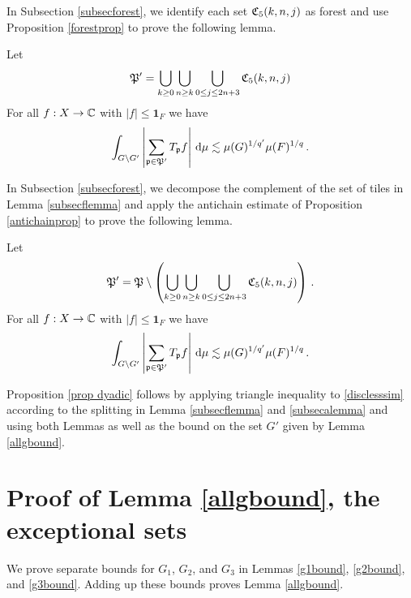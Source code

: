 In Subsection \ref{subsecforest}, we identify each set $\mathfrak C_5(k,n,j)$ as forest and use Proposition
\ref{forestprop} to prove the following lemma.


\begin{lemma}\label{subsecflemma}
  Let
  \begin{equation}
      \mathfrak P'=\bigcup_{k\ge 0}\bigcup_{n\ge k}
      \bigcup_{0\le j\le 2n+3}\mathfrak C_5(k,n,j)
  \end{equation}
  For all $f:X\to \mathbb{C}$ with $|f|\le \mathbf{1}_F$ we have
\begin{equation}
    \label{disclesssim1}
    \int_{G \setminus  G'} \left|\sum_{\mathfrak p \in \mathfrak P'} T_{\mathfrak p} f \right|\, \mathrm{d}\mu  \lesssim \mu(G)^{1/q'} \mu(F)^{1/q}\,.
\end{equation}
\end{lemma}

In Subsection \ref{subsecforest}, we decompose
the complement of the set of tiles in Lemma
\ref{subsecflemma} and apply the antichain estimate of
Proposition \ref{antichainprop} to prove the following lemma.

\begin{lemma}\label{subsecalemma}
  Let
  \begin{equation}
      \mathfrak P'=\mathfrak P\setminus \left(\bigcup_{k\ge 0}\bigcup_{n\ge k}
      \bigcup_{0\le j\le 2n+3}\mathfrak C_5(k,n,j)\right)\,.
  \end{equation}
 For all $f:X\to \mathbb{C}$ with $|f|\le \mathbf{1}_F$ we have
\begin{equation}
    \label{disclesssim2}
    \int_{G \setminus  G'} \left|\sum_{\mathfrak p \in \mathfrak P'} T_{\mathfrak p} f\right| \, \mathrm{d}\mu  \lesssim \mu(G)^{1/q'} \mu(F)^{1/q}\,.
\end{equation}
\end{lemma}
Proposition \ref{prop dyadic} follows by applying
triangle inequality to \eqref{disclesssim}
according to the splitting in Lemma \ref{subsecflemma}
and \ref{subsecalemma} and using both Lemmas as well
as the bound on the set $G'$ given by Lemma \ref{allgbound}.



\section{Proof of Lemma \ref{allgbound}, the exceptional sets}
\label{subsetexcset}


We prove separate bounds for $G_1$, $G_2$, and $G_3$
in Lemmas  \ref{g1bound},
\ref{g2bound}, and \ref{g3bound}. Adding up these bounds proves Lemma \ref{allgbound}.

